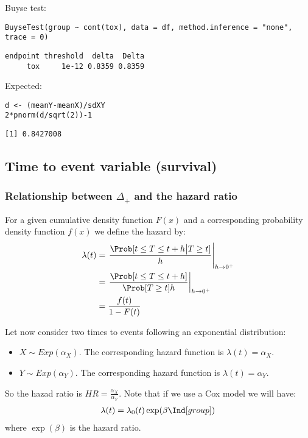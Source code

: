 \documentclass[12pt]{article}
\begin{document}
Buyse test:
\lstset{language=r,label= ,caption= ,captionpos=b,numbers=none}
\begin{lstlisting}
BuyseTest(group ~ cont(tox), data = df, method.inference = "none", trace = 0)
\end{lstlisting}

\begin{verbatim}
endpoint threshold  delta  Delta
     tox     1e-12 0.8359 0.8359
\end{verbatim}

Expected:
\lstset{language=r,label= ,caption= ,captionpos=b,numbers=none}
\begin{lstlisting}
d <- (meanY-meanX)/sdXY
2*pnorm(d/sqrt(2))-1
\end{lstlisting}

\begin{verbatim}
[1] 0.8427008
\end{verbatim}

\clearpage

\subsection{Time to event variable (survival)}
\label{sec:orgf8f5095}
\subsubsection{Relationship between \(\Delta_+\) and the hazard ratio}
\label{sec:org6bf00c5}
For a given cumulative density function \(F(x)\) and a corresponding
probability density function \(f(x)\) we define the hazard by:
\begin{align*}
\lambda(t) &=  \left. \frac{\Prob[t\leq T \leq t+h \big| T\geq t]}{h}\right|_{h \rightarrow 0^+} \\
&= \left. \frac{\Prob[t\leq T \leq t+h]}{\Prob[T\geq t]h}\right|_{h \rightarrow 0^+} \\
&= \frac{f(t)}{1-F(t)}
\end{align*}

\bigskip

Let now consider two times to events following an exponential distribution:
\begin{itemize}
\item \(X \sim Exp(\alpha_X)\). The corresponding hazard function is \(\lambda(t)=\alpha_X\).
\item \(Y \sim Exp(\alpha_Y)\). The corresponding hazard function is \(\lambda(t)=\alpha_Y\).
\end{itemize}
So the hazad ratio is \(HR = \frac{\alpha_X}{\alpha_Y}\). Note that if we use a Cox model we will have:
\begin{align*}
\lambda(t) = \lambda_0(t) \exp(\beta \Ind[group])
\end{align*}
where \(\exp(\beta)\) is the hazard ratio.
\end{document}

